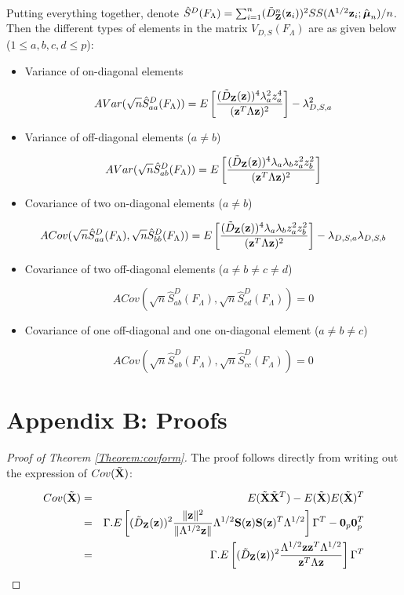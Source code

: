\paragraph{}Putting everything together, denote $\hat S^D(F_\Lambda) = \sum_{i=1}^n (\tilde D^n_{\mathbf{Z}} ({\bf{z}}_i))^2 SS(\Lambda^{1/2}{\bf{z}}_i; \hat {{\boldsymbol{\mu}}}_n)/n $. Then the different types of elements in the matrix $V_{D,S}(F_\Lambda)$ are as given below ($1 \leq a,b,c,d \leq p$):

\begin{itemize}
\item Variance of on-diagonal elements

$$ AVar( \sqrt n \hat S^D_{aa} (F_\Lambda)) = E \left[ \frac{(\tilde D_{\mathbf{Z}} ({\bf{z}}))^4 \lambda_a^2 z_a^4}{({\bf{z}}^T \Lambda {\bf{z}})^2} \right] - \lambda_{D,S,a}^2 $$

\item Variance of off-diagonal elements ($a \neq b$)

$$ AVar( \sqrt n \hat S^D_{ab} (F_\Lambda)) = E \left[ \frac{(\tilde D_{\mathbf{Z}} ({\bf{z}}))^4 \lambda_a \lambda_b z_a^2 z_b^2}{({\bf{z}}^T \Lambda {\bf{z}})^2} \right] $$

\item Covariance of two on-diagonal elements ($a \neq b$)

$$ ACov(\sqrt n \hat S^D_{aa} (F_\Lambda), \sqrt n \hat S^D_{bb} (F_\Lambda))
= E \left[ \frac{(\tilde D_{\mathbf{Z}} ({\bf{z}}))^4 \lambda_a \lambda_b z_a^2 z_b^2}{({\bf{z}}^T \Lambda {\bf{z}})^2} \right] - \lambda_{D,S,a} \lambda_{D,S,b} $$

\item Covariance of two off-diagonal elements ($a \neq b \neq c \neq d$)

$$ ACov(\sqrt n \hat S^D_{ab} (F_\Lambda), \sqrt n \hat S^D_{cd} (F_\Lambda)) = 0 $$

\item Covariance of one off-diagonal and one on-diagonal element ($a \neq b \neq c$)

$$ ACov(\sqrt n \hat S^D_{ab} (F_\Lambda), \sqrt n \hat S^D_{cc} (F_\Lambda)) = 0 $$
\end{itemize}

\section*{Appendix B: Proofs}
\begin{proof}[Proof of Theorem  \ref{Theorem:covform}]
The proof follows directly from writing out the expression of $Cov ( \tilde {{\mathbf{X}}})$:

\begin{eqnarray*}
Cov(\tilde{{\mathbf{X}}}) &=& E(\tilde{{\mathbf{X}}} \tilde{{\mathbf{X}}}^T) - E(\tilde{{\mathbf{X}}}) E(\tilde{{\mathbf{X}}})^T\\
&=& \Gamma . E \left[ (\tilde D_{\mathbf{Z}}({\bf{z}}))^2 \frac{\|{\bf{z}}\|^2}{\| \Lambda^{1/2}{\bf{z}}\|} \Lambda^{1/2} {\mathbf{S}}({\bf{z}}) {\mathbf{S}}({\bf{z}})^T \Lambda^{1/2} \right] \Gamma^T - {\bf 0}_p {\bf 0}_p^T\\
&=& \Gamma .E \left[ (\tilde D_{\mathbf{Z}}({\bf{z}}))^2 \frac{\Lambda^{1/2} {\bf{z}} {\bf{z}}^T \Lambda^{1/2}}{{\bf{z}}^T \Lambda {\bf{z}}} \right] \Gamma^T
\end{eqnarray*}
\end{proof}

